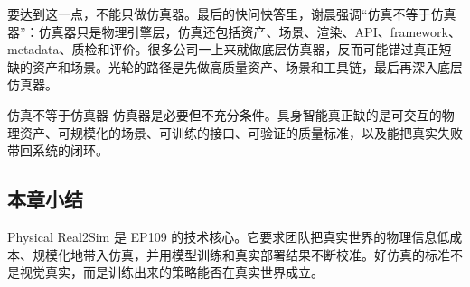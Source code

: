 要达到这一点，不能只做仿真器。最后的快问快答里，谢晨强调“仿真不等于仿真器”：仿真器只是物理引擎层，仿真还包括资产、场景、渲染、API、framework、metadata、质检和评价。很多公司一上来就做底层仿真器，反而可能错过真正短缺的资产和场景。光轮的路径是先做高质量资产、场景和工具链，最后再深入底层仿真器。

\begin{importantbox}{仿真不等于仿真器}
仿真器是必要但不充分条件。具身智能真正缺的是可交互的物理资产、可规模化的场景、可训练的接口、可验证的质量标准，以及能把真实失败带回系统的闭环。
\end{importantbox}

\subsection{本章小结}

Physical Real2Sim 是 EP109 的技术核心。它要求团队把真实世界的物理信息低成本、规模化地带入仿真，并用模型训练和真实部署结果不断校准。好仿真的标准不是视觉真实，而是训练出来的策略能否在真实世界成立。

